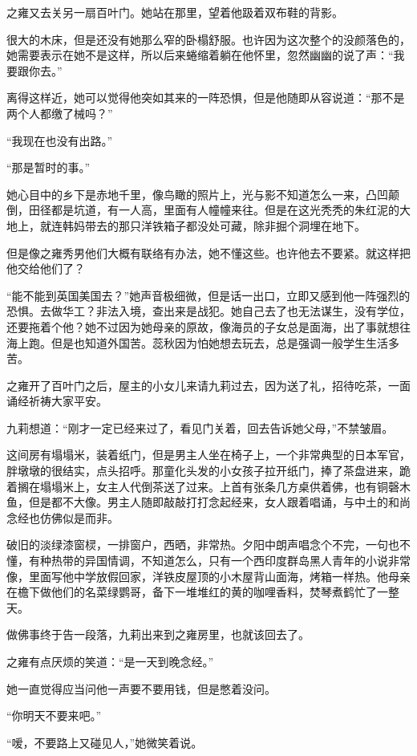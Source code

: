 \par 之雍又去关另一扇百叶门。她站在那里，望着他趿着双布鞋的背影。
\par 很大的木床，但是还没有她那么窄的卧榻舒服。也许因为这次整个的没颜落色的，她需要表示在她不是这样，所以后来蜷缩着躺在他怀里，忽然幽幽的说了声：“我要跟你去。”
\par 离得这样近，她可以觉得他突如其来的一阵恐惧，但是他随即从容说道：“那不是两个人都缴了械吗？”
\par “我现在也没有出路。”
\par “那是暂时的事。”
\par 她心目中的乡下是赤地千里，像鸟瞰的照片上，光与影不知道怎么一来，凸凹颠倒，田径都是坑道，有一人高，里面有人幢幢来往。但是在这光秃秃的朱红泥的大地上，就连韩妈带去的那只洋铁箱子都没处可藏，除非掘个洞埋在地下。
\par 但是像之雍秀男他们大概有联络有办法，她不懂这些。也许他去不要紧。就这样把他交给他们了？
\par “能不能到英国美国去？”她声音极细微，但是话一出口，立即又感到他一阵强烈的恐惧。去做华工？非法入境，查出来是战犯。她自己去了也无法谋生，没有学位，还要拖着个他？她不过因为她母亲的原故，像海员的子女总是面海，出了事就想往海上跑。但是也知道外国苦。蕊秋因为怕她想去玩去，总是强调一般学生生活多苦。
\par 之雍开了百叶门之后，屋主的小女儿来请九莉过去，因为送了礼，招待吃茶，一面诵经祈祷大家平安。
\par 九莉想道：“刚才一定已经来过了，看见门关着，回去告诉她父母，”不禁皱眉。
\par 这间房有塌塌米，装着纸门，但是男主人坐在椅子上，一个非常典型的日本军官，胖墩墩的很结实，点头招呼。那童化头发的小女孩子拉开纸门，捧了茶盘进来，跪着搁在塌塌米上，女主人代倒茶送了过来。上首有张条几方桌供着佛，也有铜磬木鱼，但是都不大像。男主人随即敲敲打打念起经来，女人跟着唱诵，与中土的和尚念经也仿佛似是而非。
\par 破旧的淡绿漆窗棂，一排窗户，西晒，非常热。夕阳中朗声唱念个不完，一句也不懂，有种热带的异国情调，不知道怎么，只有一个西印度群岛黑人青年的小说非常像，里面写他中学放假回家，洋铁皮屋顶的小木屋背山面海，烤箱一样热。他母亲在檐下做他们的名菜绿鹦哥，备下一堆堆红的黄的咖哩香料，焚琴煮鹤忙了一整天。
\par 做佛事终于告一段落，九莉出来到之雍房里，也就该回去了。
\par 之雍有点厌烦的笑道：“是一天到晚念经。”
\par 她一直觉得应当问他一声要不要用钱，但是憋着没问。
\par “你明天不要来吧。”
\par “嗳，不要路上又碰见人，”她微笑着说。
